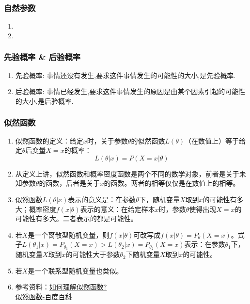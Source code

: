 \subsubsection{自然参数}
\begin{enumerate}
	\item 
	\item 
\end{enumerate}

\subsubsection{先验概率 \& 后验概率}
\begin{enumerate}
	\item 先验概率: 事情还没有发生,要求这件事情发生的可能性的大小,是先验概率. 
	\item 后验概率: 事情已经发生,要求这件事情发生的原因是由某个因素引起的可能性的大小,是后验概率.
\end{enumerate}

\subsubsection{似然函数}
\begin{enumerate}
	\item 似然函数的定义：给定$x$时，关于参数$\theta$的似然函数$L(\theta)$（在数值上）等于给定$\theta$后变量$X=x$的概率：
	\begin{equation}
		L(\theta|x) = P(X=x|\theta)
	\end{equation}
	\item 从定义上讲，似然函数和概率密度函数是两个不同的数学对象，前者是关于未知参数$\theta$的函数，后者是关于$x$的函数。两者的相等仅仅是在数值上的相等。
	\item 似然函数$L(\theta|x)$表示的意义是：在参数$\theta$下，随机变量$X$取到$x$的可能性有多大；概率密度$f(x|\theta)$表示的意义：在给定样本$x$时，参数$\theta$使得出现$X=x$的可能性有多大。二者表示的都是可能性。
	\item 若$X$是一个离散型随机变量，则$f(x|\theta)$可改写成$f(x|\theta)=P_\theta(X=x)$。式子$L(\theta_1|x)=P_{\theta_1}(X=x) > L(\theta_2|x)=P_{\theta_2}(X=x)$表示：在参数$\theta_1$下，随机变量$X$取到$x$的可能性大于参数$\theta_2$下随机变量$X$取到$x$的可能性。
	\item 若$X$是一个联系型随机变量也类似。
	\item 参考资料：\href{https://www.zhihu.com/question/54082000}{如何理解似然函数?} \\
	\href{http://baike.baidu.com/subview/1864828/1864828.htm}{似然函数-百度百科}
\end{enumerate}

